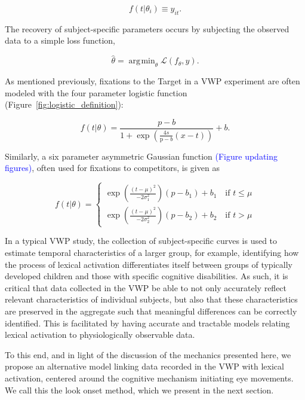 \documentclass{article}
\providecommand{\cn}[1]{\textcolor{blue}{#1}}
\DeclareMathOperator*{\argmin}{arg\!\min}
\begin{document}
\begin{equation}\label{eq:empir_to_activation}
f(t | \theta_i) \equiv y_{it}.
\end{equation}

The recovery of subject-specific parameters occurs by subjecting the observed data to a simple loss function, 

\begin{equation}\label{eq:prop_loss}
\hat{\theta} = \argmin_{\theta} \mathcal{L}(f_{\theta}, y).
\end{equation}

As mentioned previously, fixations to the Target in a VWP experiment are often modeled with the four parameter logistic function (Figure~\ref{fig:logistic_definition}):

\begin{equation} \label{eq:logistic1}
f(t|\theta) = \frac{p-b}{1 + \exp \left(\frac{4s}{\text{p}-b} (x - t) \right)} + b.
\end{equation}

Similarly, a six parameter asymmetric Gaussian function \cn{(Figure updating figures)}, often used for fixations to competitors, is given as

\begin{equation} \label{eq:dg2}
f(t|\theta) = \begin{cases}
\exp \left( \frac{(t - \mu)^2}{-2\sigma_1^2} \right) (p - b_1) + b_1 \quad \text{if } t \leq \mu \\
\exp \left( \frac{(t - \mu)^2}{-2\sigma_2^2} \right) (p - b_2) + b_2 \quad \text{if } t > \mu
\end{cases}
\end{equation}


In a typical VWP study, the collection of subject-specific curves is used to estimate temporal characteristics of a larger group, for example, identifying how the process of lexical activation differentiates itself between groups of typically developed children and those with specific cognitive disabilities. As such, it is critical that data collected in the VWP be able to not only accurately reflect relevant characteristics of individual subjects, but also that these characteristics are preserved in the aggregate such that meaningful differences can be correctly identified. This is facilitated by having accurate and tractable models relating lexical activation to physiologically observable data. 

To this end, and in light of the discussion of the mechanics presented here, we propose an alternative model linking data recorded in the VWP with lexical activation, centered around the cognitive mechanism initiating eye movements. We call this the look onset method, which we present in the next section.
\end{document}
